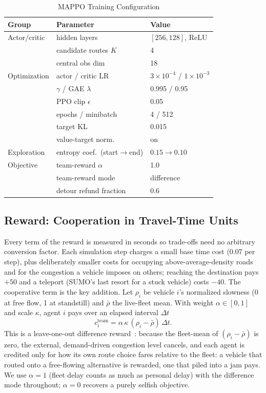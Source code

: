 \begin{table}[!t]
\caption{MAPPO Training Configuration}
\label{tab:hyper}
\centering
\footnotesize
\setlength{\tabcolsep}{3.2pt}
\begin{tabular}{lll}
\toprule
Group & Parameter & Value \\
\midrule
Actor/critic & hidden layers & $[256,128]$, ReLU \\
             & candidate routes $K$ & 4 \\
             & central obs dim & 18 \\
Optimization & actor / critic LR & $3\times10^{-4}$ / $1\times10^{-3}$ \\
             & $\gamma$ / GAE $\lambda$ & 0.995 / 0.95 \\
             & PPO clip $\epsilon$ & 0.05 \\
             & epochs / minibatch & 4 / 512 \\
             & target KL & 0.015 \\
             & value-target norm. & on \\
Exploration  & entropy coef.\ (start$\to$end) & $0.15 \to 0.10$ \\
Objective    & team-reward $\alpha$ & 1.0 \\
             & team-reward mode & difference \\
             & detour refund fraction & 0.6 \\
\bottomrule
\end{tabular}
\end{table}

\subsection{Reward: Cooperation in Travel-Time Units}
Every term of the reward is measured in seconds so trade-offs need no arbitrary
conversion factor. Each simulation step charges a small base time cost (0.07 per step),
plus deliberately smaller costs for occupying above-average-density roads and for the
congestion a vehicle imposes on others; reaching the destination pays $+50$ and a
teleport (SUMO's last resort for a stuck vehicle) costs $-40$. The cooperative term is
the key addition. Let $\rho_i$ be vehicle $i$'s normalized slowness (0 at free flow, 1 at
standstill) and $\bar\rho$ the live-fleet mean. With weight $\alpha\in[0,1]$ and scale
$\kappa$, agent $i$ pays over an elapsed interval $\Delta t$
\begin{equation}
  c^{\text{team}}_i = \alpha\,\kappa\,(\rho_i - \bar\rho)\,\Delta t .
\end{equation}
This is a leave-one-out difference reward~\citep{wolpert2001collectives}: because the
fleet-mean of $(\rho_i-\bar\rho)$ is zero, the external, demand-driven congestion level
cancels, and each agent is credited only for how its own route choice fares relative to
the fleet: a vehicle that routed onto a free-flowing alternative is rewarded, one that
piled into a jam pays. We use $\alpha{=}1$ (fleet delay counts as much as personal delay)
with the difference mode throughout; $\alpha{=}0$ recovers a purely selfish objective.

